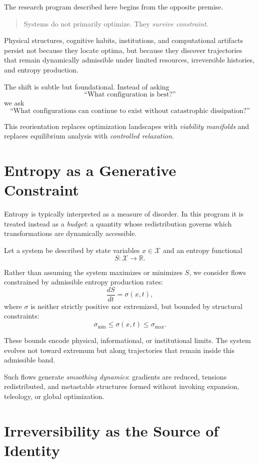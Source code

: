 \documentclass[12pt]{article}
\begin{document}
The research program described here begins from the opposite premise.

\begin{quote}
Systems do not primarily optimize. They \emph{survive constraint}.
\end{quote}

Physical structures, cognitive habits, institutions, and computational artifacts persist not because they locate optima, but because they discover trajectories that remain dynamically admissible under limited resources, irreversible histories, and entropy production.

The shift is subtle but foundational. Instead of asking
\[
\text{``What configuration is best?''}
\]
we ask
\[
\text{``What configurations can continue to exist without catastrophic dissipation?''}
\]

This reorientation replaces optimization landscapes with \emph{viability manifolds} and replaces equilibrium analysis with \emph{controlled relaxation}.

\section{Entropy as a Generative Constraint}

Entropy is typically interpreted as a measure of disorder. In this program it is treated instead as a \emph{budget}: a quantity whose redistribution governs which transformations are dynamically accessible.

Let a system be described by state variables $x \in \mathcal{X}$ and an entropy functional
\[
S : \mathcal{X} \longrightarrow \mathbb{R}.
\]

Rather than assuming the system maximizes or minimizes $S$, we consider flows constrained by admissible entropy production rates:
\[
\frac{dS}{dt} = \sigma(x,t),
\]
where $\sigma$ is neither strictly positive nor extremized, but bounded by structural constraints:
\[
\sigma_{\min} \le \sigma(x,t) \le \sigma_{\max}.
\]

These bounds encode physical, informational, or institutional limits. The system evolves not toward extremum but along trajectories that remain inside this admissible band.

Such flows generate \emph{smoothing dynamics}: gradients are reduced, tensions redistributed, and metastable structures formed without invoking expansion, teleology, or global optimization.

\section{Irreversibility as the Source of Identity}
\end{document}
